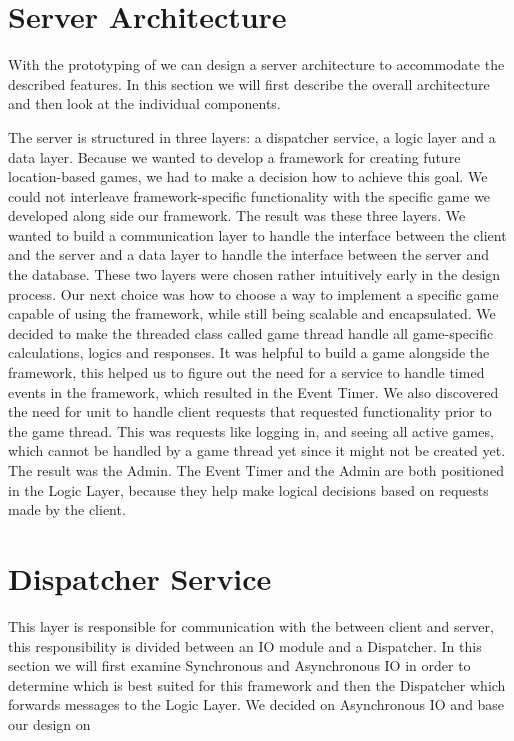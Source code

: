 \section{Server Architecture}
\label{sec:server}
With the prototyping of  we can design a server architecture to accommodate the described features. In this section we will first describe the overall architecture and then look at the individual components.

The server is structured in three layers: a dispatcher service, a logic layer and a data layer. Because we wanted to develop a framework for creating future location-based games, we had to make a decision how to achieve this goal. We could not interleave framework-specific functionality with the specific game we developed along side our framework. The result was these three layers. We wanted to build a communication layer to handle the interface between the client and the server and a data layer to handle the interface between the server and the database. These two layers were chosen rather intuitively early in the design process. Our next choice was how to choose a way to implement a specific game capable of using the framework, while still being scalable and encapsulated. We decided to make the threaded class called game thread handle all game-specific calculations, logics and responses. 
It was helpful to build a game alongside the framework, this helped us to figure out the need for a service to handle timed events in the framework, which resulted in the Event Timer. We also discovered the need for unit to handle client requests that requested functionality prior to the game thread. This was requests like logging in, and seeing all active games, which cannot be handled by a game thread yet since it might not be created yet. The result was the Admin. The Event Timer and the Admin are both positioned in the Logic Layer, because they help make logical decisions based on requests made by the client. 



\section{Dispatcher Service}
This layer is responsible for communication with the between client and server, this responsibility is divided between an IO module and a Dispatcher. In this section we will first examine Synchronous and Asynchronous IO in order to determine which is best suited for this framework and then the Dispatcher which forwards messages to the Logic Layer. We decided on Asynchronous IO and base our design on \cite{?} 	 %




